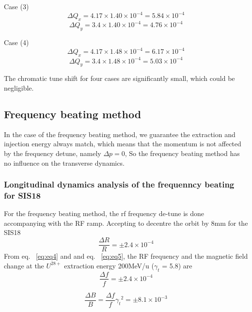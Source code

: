 Case (3)
\begin{equation}
\Delta Q_x = 4.17 \times 1.40 \times 10^{-4}=5.84 \times 10^{-4}
\end{equation}
\begin{equation}
\Delta Q_y = 3.4 \times 1.40 \times 10^{-4}=4.76 \times 10^{-4} 
\end{equation}

Case (4) 
\begin{equation}
\Delta Q_x = 4.17 \times 1.48 \times 10^{-4}=6.17 \times 10^{-4}
\end{equation}
\begin{equation}
\Delta Q_y = 3.4 \times 1.48 \times 10^{-4}=5.03 \times 10^{-4} 
\end{equation}

The chromatic tune shift for four cases are significantly small, which could be negligible.
\subsection{Frequency beating method}
In the case of the frequency beating method, we guarantee the extraction and injection energy always match, which means that the momentum is not affected by the frequency detune, namely $\Delta p = 0$, So the frequency beating method has no influence on the transverse dynamics.

\subsubsection{Longitudinal dynamics analysis of the frequenncy beating for SIS18}
For the frequency beating method, the rf frequency de-tune is done accompanying with
the RF ramp. Accepting to decentre the orbit by 8mm for the SIS18 
\begin{equation}
\frac{\Delta{R}}{R} = \pm 2.4 \times 10^{-4}
\end{equation}
From eq. ~\ref{eq:eq4} and and eq. ~\ref{eq:eq5}, the RF frequency and the magnetic field change at the $U^{28+}$ extraction energy 200MeV/u ($\gamma_t$ = 5.8) are
\begin{equation}
\frac{\Delta{f}}{f} = \pm 2.4 \times 10^{-4}
\end{equation}

\begin{equation}
\frac{\Delta{B}}{B}=\frac{\Delta{f}}{f}{\gamma_t}^2 = \pm 8.1 \times 10^{-3}
\end{equation}

